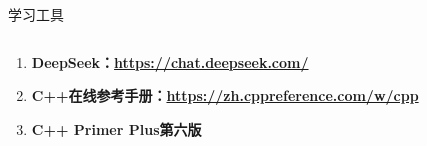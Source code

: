 \documentclass[aspectratio=169]{ctexbeamer} %
\begin{document}
\begin{frame}[t]{学习工具}
\begin{columns}
\begin{spacing}{1.5} %
{
\large
\begin{enumerate}[label={\arabic*.}]
\item \textbf{DeepSeek：\textcolor{blue}{\href{https://chat.deepseek.com/}{https://chat.deepseek.com/}}}
\item \textbf{C++在线参考手册：\textcolor{blue}{\href{https://zh.cppreference.com/w/cpp}{https://zh.cppreference.com/w/cpp}}}
\item \textbf{C++ Primer Plus第六版}
\end{enumerate}
}
\end{spacing}
\end{columns}
\end{frame}
\end{document}
